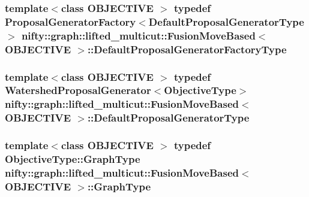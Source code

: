 \subsubsection[{Default\+Proposal\+Generator\+Factory\+Type}]{\setlength{\rightskip}{0pt plus 5cm}template$<$class O\+B\+J\+E\+C\+T\+I\+V\+E $>$ typedef {\bf Proposal\+Generator\+Factory}$<${\bf Default\+Proposal\+Generator\+Type}$>$ {\bf nifty\+::graph\+::lifted\+\_\+multicut\+::\+Fusion\+Move\+Based}$<$ O\+B\+J\+E\+C\+T\+I\+V\+E $>$\+::{\bf Default\+Proposal\+Generator\+Factory\+Type}}\label{classnifty_1_1graph_1_1lifted__multicut_1_1FusionMoveBased_a668ca7363da00e5aeb55375ea74c22c0}
\hypertarget{classnifty_1_1graph_1_1lifted__multicut_1_1FusionMoveBased_af703c131ea7b4f0c59bda2cd27f6c29c}{}
\subsubsection[{Default\+Proposal\+Generator\+Type}]{\setlength{\rightskip}{0pt plus 5cm}template$<$class O\+B\+J\+E\+C\+T\+I\+V\+E $>$ typedef {\bf Watershed\+Proposal\+Generator}$<${\bf Objective\+Type}$>$ {\bf nifty\+::graph\+::lifted\+\_\+multicut\+::\+Fusion\+Move\+Based}$<$ O\+B\+J\+E\+C\+T\+I\+V\+E $>$\+::{\bf Default\+Proposal\+Generator\+Type}}\label{classnifty_1_1graph_1_1lifted__multicut_1_1FusionMoveBased_af703c131ea7b4f0c59bda2cd27f6c29c}
\hypertarget{classnifty_1_1graph_1_1lifted__multicut_1_1FusionMoveBased_ad9a415cda34d465df54976611bb6f059}{}
\subsubsection[{Graph\+Type}]{\setlength{\rightskip}{0pt plus 5cm}template$<$class O\+B\+J\+E\+C\+T\+I\+V\+E $>$ typedef Objective\+Type\+::\+Graph\+Type {\bf nifty\+::graph\+::lifted\+\_\+multicut\+::\+Fusion\+Move\+Based}$<$ O\+B\+J\+E\+C\+T\+I\+V\+E $>$\+::{\bf Graph\+Type}}\label{classnifty_1_1graph_1_1lifted__multicut_1_1FusionMoveBased_ad9a415cda34d465df54976611bb6f059}
\hypertarget{classnifty_1_1graph_1_1lifted__multicut_1_1FusionMoveBased_a7935dfacf7e07d7533c26bf3c0afcb1e}{}
